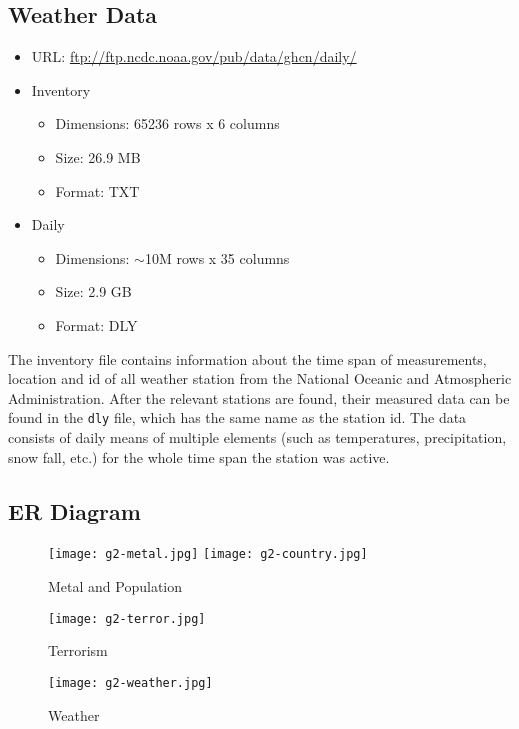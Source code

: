 \subsection{Weather Data}
\begin{itemize}
	\item URL: \url{ftp://ftp.ncdc.noaa.gov/pub/data/ghcn/daily/}
	\item Inventory
	\begin{itemize}
	  \item Dimensions: 65236 rows x 6 columns
	  \item Size: 26.9 MB
	  \item Format: TXT
    \end{itemize}
	\item Daily
	\begin{itemize}
	  \item Dimensions: $\sim$10M rows x 35 columns
	  \item Size: 2.9 GB
	  \item Format: DLY
    \end{itemize}
\end{itemize}

The inventory file contains information about the time span of measurements, location and id of all weather station from the National Oceanic and Atmospheric Administration. After the relevant stations are found, their measured data can be found in the \texttt{dly} file, which has the same name as the station id. The data consists of daily means of multiple elements (such as temperatures, precipitation, snow fall, etc.) for the whole time span the station was active.

\subsection{ER Diagram}
\begin{figure}[hbt!]
    \texttt{[image: g2-metal.jpg]}
    \texttt{[image: g2-country.jpg]}
    \caption{Metal and Population}
\label{fig:singlesource}
\end{figure}

\begin{figure}[hbt!]
    \centering
    \texttt{[image: g2-terror.jpg]}
    \caption{Terrorism}
\label{fig:singlesource}
\end{figure}

\begin{figure}[hbt!]
    \centering
    \texttt{[image: g2-weather.jpg]}
    \caption{Weather}
\label{fig:singlesource}
\end{figure}

